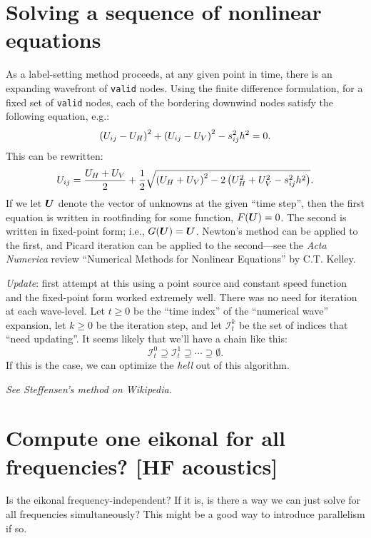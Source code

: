 \documentclass[eikonal.tex]{subfiles}
\begin{document}
\section{Solving a sequence of nonlinear equations}

As a label-setting method proceeds, at any given point in time, there
is an expanding wavefront of \texttt{valid} nodes. Using the finite
difference formulation, for a fixed set of \texttt{valid} nodes, each
of the bordering downwind nodes satisfy the following equation, e.g.:
\begin{equation}
  \left(U_{ij} - U_H\right)^2 + \left(U_{ij} - U_V\right)^2 - s_{ij}^2 h^2 = 0.
\end{equation}
This can be rewritten:
\begin{equation}
  U_{ij} = \frac{U_H + U_V}{2} + \frac{1}{2} \sqrt{\left(U_H + U_V\right)^2 - 2\left(U_H^2 + U_V^2 - s_{ij}^2 h^2\right)}.
\end{equation}
If we let $\boldsymbol{U}$ denote the vector of unknowns at the given ``time
step'', then the first equation is written in rootfinding for some
function, $F(\boldsymbol{U}) = 0$. The second is written in fixed-point form;
i.e., $G(\boldsymbol{U}) = \boldsymbol{U}$. Newton's method can be applied to the first,
and Picard iteration can be applied to the second---see the \emph{Acta
  Numerica} review ``Numerical Methods for Nonlinear Equations'' by
C.T. Kelley.

\emph{Update}: first attempt at this using a point source and constant
speed function and the fixed-point form worked extremely well. There
was no need for iteration at each wave-level. Let $t \geq 0$ be the
``time index'' of the ``numerical wave'' expansion, let $k \geq 0$ be
the iteration step, and let $\mathcal{I}_t^k$ be the set of indices
that ``need updating''. It seems likely that we'll have a chain like
this:
\begin{equation}
  \mathcal{I}_t^0 \supseteq \mathcal{I}_t^1 \supseteq \cdots \supseteq \emptyset.
\end{equation}
If this is the case, we can optimize the \emph{hell} out of this
algorithm.

\emph{See Steffensen's method on Wikipedia.}

\section{Compute one eikonal for all frequencies? [HF acoustics]}

Is the eikonal frequency-independent? If it is, is there a way we can
just solve for all frequencies simultaneously? This might be a good
way to introduce parallelism if so.
\end{document}
